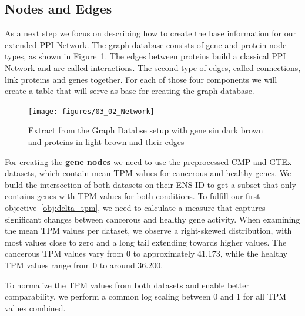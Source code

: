 \subsection{Nodes and Edges} \label{subsec:nodes_and_edges}

As a next step we focus on describing how to create the base information for our extended PPI Network.
The graph database consists of gene and protein node types, as shown in Figure~\ref{fig:03_02_Network}.
The edges between proteins build a classical PPI Network and are called interactions. %
The second type of edges, called connections, link proteins and genes together.
For each of those four components we will create a table that will serve as base for creating the graph database.\\


\begin{figure}[h]
    \centering
    \texttt{[image: figures/03\_02\_Network]}
    \caption{Extract from the Graph Databse setup with gene sin dark brown and proteins in light brown and their edges}
    \label{fig:03_02_Network}
\end{figure}

For creating the \textbf{gene nodes} we need to use the preprocessed CMP and GTEx datasets,
which contain mean TPM values for cancerous and healthy genes.
We build the intersection of both datasets on their ENS ID to get a subset that only contains genes with TPM values for both conditions.
To fulfill our first objective~\ref{obj:delta_tpm},
we need to calculate a measure that captures significant changes between cancerous and healthy gene activity.
When examining the mean TPM values per dataset, we observe a right-skewed distribution, with most values close to zero
and a long tail extending towards higher values.
The cancerous TPM values vary from 0 to approximately 41.173, while the healthy TPM values range from 0 to around 36.200.


To normalize the TPM values from both datasets and enable better comparability, we perform a common log scaling between 0 and 1 for all TPM values combined.

